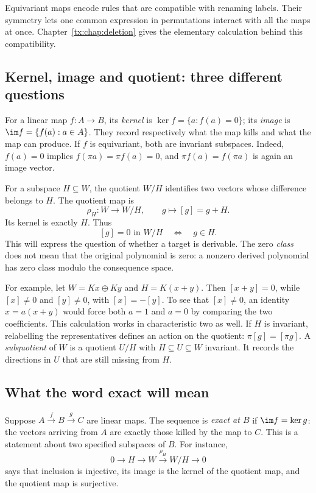 Equivariant maps encode rules that are compatible with renaming labels.
Their symmetry lets one common expression in permutations interact
with all the maps at once. Chapter~\ref{tx:chap:deletion} gives the
elementary calculation behind this compatibility.

\subsection{Kernel, image and quotient: three different questions}
For a linear map $f:A\to B$, its \emph{kernel} is
$\ker f=\{a:f(a)=0\}$; its \emph{image} is
$\im f=\{f(a):a\in A\}$. They record respectively what the map kills
and what the map can produce. If $f$ is equivariant, both are invariant
subspaces. Indeed, $f(a)=0$ implies $f(\pi a)=\pi f(a)=0$, and
$\pi f(a)=f(\pi a)$ is again an image vector.

For a subspace $H\subseteq W$, the quotient $W/H$ identifies two
vectors whose difference belongs to $H$. The quotient map is
\[
                  \rho_H:W\to W/H,\qquad g\mapsto[g]=g+H.
\]
Its kernel is exactly $H$. Thus
\[
                         [g]=0\text{ in }W/H
                              \quad\Longleftrightarrow\quad g\in H.
\]
This will express the question of whether a target is derivable.
The zero \emph{class} does not mean that the original polynomial is
zero: a nonzero derived polynomial has zero class modulo the
consequence space.

For example, let $W=Kx\oplus Ky$ and $H=K(x+y)$. Then
$[x+y]=0$, while $[x]\ne0$ and $[y]\ne0$, with $[x]=-[y]$.
To see that $[x]\ne0$, an identity $x=a(x+y)$ would force both
$a=1$ and $a=0$ by comparing the two coefficients.
This calculation works in characteristic two as well.
If $H$ is invariant, relabelling the representatives defines an action
on the quotient: $\pi[g]=[\pi g]$.
A \emph{subquotient} of $W$ is a quotient $U/H$ with
$H\subseteq U\subseteq W$ invariant. It records the directions in
$U$ that are still missing from $H$.

\subsection{What the word exact will mean}
Suppose $A\xrightarrow{f}B\xrightarrow{g}C$ are linear maps.
The sequence is \emph{exact at $B$} if $\im f=\ker g$:
the vectors arriving from $A$ are exactly those killed by the map to
$C$. This is a statement about two specified subspaces of $B$.
For instance,
\[
        0\longrightarrow H\longrightarrow W
                      \xrightarrow{\rho_H}W/H\longrightarrow0
\]
says that inclusion is injective, its image is the kernel of the
quotient map, and the quotient map is surjective.

